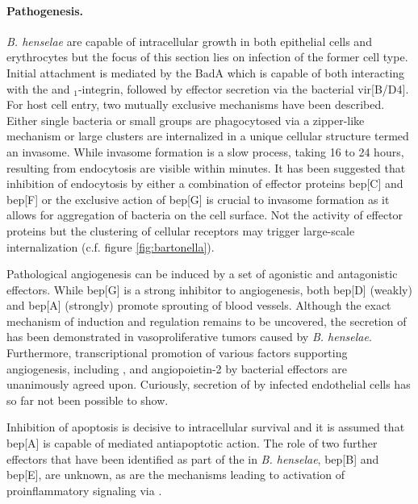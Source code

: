 \paragraph{Pathogenesis.}
\textit{B. henselae} are capable of intracellular growth in both epithelial cells and erythrocytes but the focus of this section lies on infection of the former cell type. Initial attachment is mediated by the  BadA which is capable of both interacting with the  and \textbeta$_1$-integrin, followed by effector secretion via the bacterial  \acrshort{vir}[B\slash D4]. For host cell entry, two mutually exclusive mechanisms have been described. Either single bacteria or small groups are phagocytosed via a zipper-like mechanism or large clusters are internalized in a unique cellular structure termed an invasome. While invasome formation is a slow process, taking 16 to 24 hours,  resulting from endocytosis are visible within minutes. It has been suggested that inhibition of endocytosis by either a combination of effector proteins \acrshort{bep}[C] and \acrshort{bep}[F] or the exclusive action of \acrshort{bep}[G] is crucial to invasome formation as it allows for aggregation of bacteria on the cell surface. Not the activity of effector proteins but the clustering of cellular receptors may trigger large-scale internalization (c.f. figure \ref{fig:bartonella}).

Pathological angiogenesis can be induced by a set of agonistic and antagonistic effectors. While \acrshort{bep}[G] is a strong inhibitor to angiogenesis, both \acrshort{bep}[D] (weakly) and \acrshort{bep}[A] (strongly) promote sprouting of blood vessels. Although the exact mechanism of induction and regulation remains to be uncovered, the secretion of  has been demonstrated in vasoproliferative tumors caused by \textit{B. henselae}. Furthermore, transcriptional promotion of various factors supporting angiogenesis, including ,  and angiopoietin-2 by bacterial effectors are unanimously agreed upon. Curiously, secretion of  by infected endothelial cells has so far not been possible to show.

Inhibition of apoptosis is decisive to intracellular survival and it is assumed that \acrshort{bep}[A] is capable of  mediated antiapoptotic action. The role of two further effectors that have been identified as part of the  in \textit{B. henselae}, \acrshort{bep}[B] and \acrshort{bep}[E], are unknown, as are the mechanisms leading to activation of proinflammatory signaling via .

